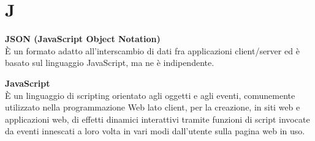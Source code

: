 \section{J}
\textbf{JSON (JavaScript Object Notation)}\\
È un formato adatto all'interscambio di dati fra applicazioni client/server ed è basato sul linguaggio JavaScript, ma ne è indipendente.

\textbf{JavaScript}\\
È un linguaggio di scripting orientato agli oggetti e agli eventi, comunemente utilizzato nella programmazione Web lato client, per la creazione, in siti web e applicazioni web, di effetti dinamici interattivi tramite funzioni di script invocate da eventi innescati a loro volta in vari modi dall'utente sulla pagina web in uso.

\clearpage